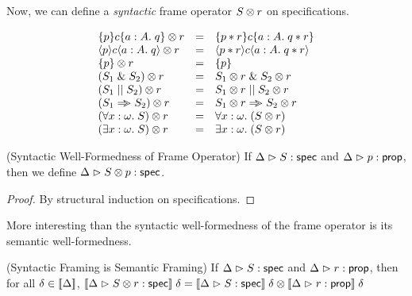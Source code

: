 Now, we can define a \emph{syntactic} frame operator ${S} \otimes {r}$
on specifications. 

\begin{displaymath}
  \begin{array}{lcl}
    {\{{p}\}{c}\{{a:A}.\;{q}\}} \otimes {r}    & = & \{{p * r}\}{c}\{{a:A}.\;{q * r}\} \\
    {\langle{p}\rangle{c}\langle{a:A}.\;{q}\rangle} \otimes {r}   & = & \langle{p * r}\rangle{c}\langle{a:A}.\;{q * r}\rangle \\
    {\{{p}\}} \otimes {r}              & = & \{{p}\} \\
    {(S_1 \;\&\; S_2)} \otimes {r}      & = & {S_1} \otimes {r} \;\&\; {S_2} \otimes {r} \\
    {(S_1 \;||\; S_2)} \otimes {r}       & = & {S_1} \otimes {r} \;||\; {S_2} \otimes {r} \\
    {(S_1 \Rightarrow\!\!\!> S_2)} \otimes {r}      & = & {S_1} \otimes {r} \Rightarrow\!\!\!> {S_2} \otimes {r} \\
    {(\forall x:\omega.\; S)} \otimes {r} & = & \forall x:\omega.\; ({S} \otimes {r}) \\
    {(\exists x:\omega.\; S)} \otimes {r} & = & \exists x:\omega.\; ({S} \otimes {r}) \\
  \end{array}
\end{displaymath}

\begin{prop}{(Syntactic Well-Formedness of Frame Operator)}
If ${\Delta} \vartriangleright {S} : \mathsf{spec}$ and ${\Delta} \vartriangleright {p} : {\mathsf{prop}}$, then
we define ${\Delta} \vartriangleright {{S} \otimes {p}} : \mathsf{spec}$.  
\end{prop}
\begin{proof}
  By structural induction on specifications.
\end{proof}

More interesting than the syntactic well-formedness of the frame
operator is its semantic well-formedness. 

\begin{lemma}{(Syntactic Framing is Semantic Framing)}
If ${\Delta} \vartriangleright {S} : \mathsf{spec}$ and ${\Delta} \vartriangleright {r} : {\mathsf{prop}}$, then for all $\delta \in [\![{\Delta}]\!]$, 
$[\![{{\Delta} \vartriangleright {{S} \otimes {r}} : \mathsf{spec}}]\!]\;\delta = 
{[\![{{\Delta} \vartriangleright {S} : \mathsf{spec}}]\!]\;\delta} \otimes {[\![{{\Delta} \vartriangleright {r} : {\mathsf{prop}}}]\!]\;\delta}$ \\
\end{lemma}

